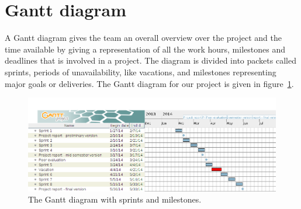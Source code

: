 \section{Gantt diagram}
\label{sec:gantt}

A Gantt diagram gives the team an overall overview over the project and the time available by giving a representation of all the work hours, milestones and deadlines that is involved in a project. The diagram is divided into packets called sprints, periods of unavailability, like vacations, and milestones representing major goals or deliveries.
The Gantt diagram for our project is given in figure~\ref{fig:gantt}.


\begin{figure}[H]
\includegraphics[width=\textwidth]{ch/planning/fig/gantt.png}
\caption{The Gantt diagram with sprints and milestones.}
\label{fig:gantt}
\end{figure}
